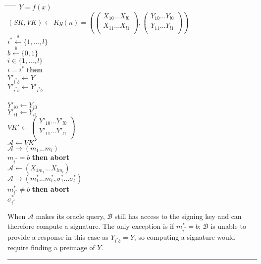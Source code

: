 \documentclass[twoside]{article}
\newenvironment{proof}{{\bf Proof:}}{\hfill\rule{2mm}{2mm}}
\begin{document}
\begin{proof}
\begin{tabbing}
\hspace*{.25in} \= \hspace*{.25in} \= \hspace*{.25in} \= \hspace*{.25in} \= \hspace*{.25in} \=\kill
{} $Y = f(x)$\\
\>$(SK, VK) \leftarrow Kg(n) = \left(
\begin{pmatrix}
X_{10}...X_{l0}\\
X_{11}...X_{l1}\\
\end{pmatrix},
\begin{pmatrix}
Y_{10}...Y_{l0}\\
Y_{11}...Y_{l1}\\
\end{pmatrix}\right)$\\
\>$i^* \xleftarrow{\$} \{1,...,l\} $\\
\>$b \xleftarrow{\$} \{0,1\}$\\
 $i \in \{1,...,l\}$\\
\> $i = i^*$ {\bf then}\\
\>\>\>$Y'_{i^*b} \leftarrow Y$\\
\>\>\>$Y'_{i^*\bar{b}} \leftarrow Y'_{i^*\bar{b}}$\\
\>\\
\>\>\>$Y'_{i0} \leftarrow Y_{i0}$\\
\>\>\>$Y'_{i1} \leftarrow Y_{i1}$\\
\>$VK' \leftarrow
\begin{pmatrix}
Y'_{10}...Y'_{l0}\\
Y'_{11}...Y'_{l1}\\
\end{pmatrix}$\\
\>$\mathcal{A} \leftarrow VK'$\\
\>$\mathcal{A} \rightarrow (m_1...m_l)$\\
 $m_{i^*} = b$ {\bf then abort}\\
\>$\mathcal{A} \leftarrow (X_{1m_1}...X_{lm_l})$\\
\>$\mathcal{A} \rightarrow (m^*_1...m^*_l,\sigma^*_1...\sigma^*_l)$\\
 $m^*_{i^*} \neq b$ {\bf then abort}\\
 $\sigma^*_{i^*}$
\end{tabbing}

When $\mathcal{A}$ makes its oracle query, $\mathcal{B}$ still has access to the signing key and can therefore compute a signature. The only exception is if $m^*_{i^*} = b$; $\mathcal{B}$ is unable to provide a response in this case as $Y_{i^*b} = Y$, so computing a signature would require finding a preimage of $Y$.


\end{proof}
\end{document}
